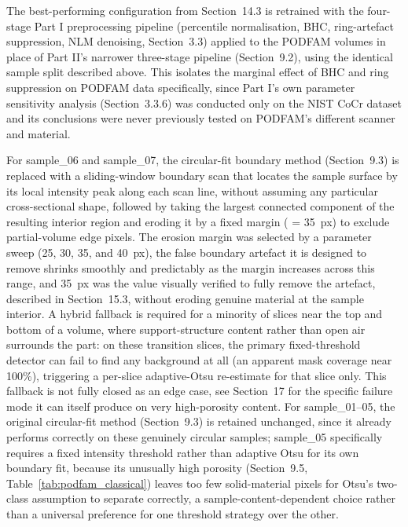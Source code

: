 The best-performing configuration from Section~14.3 is retrained with the four-stage Part I
preprocessing pipeline (percentile normalisation, BHC, ring-artefact suppression, NLM denoising,
Section~3.3) applied to the PODFAM volumes in place of Part II's narrower three-stage pipeline
(Section~9.2), using the identical sample split described above. This isolates the marginal effect of
BHC and ring suppression on PODFAM data specifically, since Part I's own parameter sensitivity
analysis (Section~3.3.6) was conducted only on the NIST CoCr dataset and its conclusions were never
previously tested on PODFAM's different scanner and material.

For sample\_06 and sample\_07, the circular-fit boundary method (Section~9.3) is replaced with a
sliding-window boundary scan that locates the sample surface by its local intensity peak along each
scan line, without assuming any particular cross-sectional shape, followed by taking the largest
connected component of the resulting interior region and eroding it by a fixed margin
( = 35~px) to exclude partial-volume edge pixels. The erosion margin was
selected by a parameter sweep (25, 30, 35, and 40~px), the false boundary artefact it is designed to
remove shrinks smoothly and predictably as the margin increases across this range, and 35~px was the
value visually verified to fully remove the artefact, described in Section~15.3, without eroding
genuine material at the sample interior. A hybrid fallback is required for a minority of slices near
the top and bottom of a volume, where support-structure content rather than open air surrounds the
part: on these transition slices, the primary fixed-threshold detector can fail to find any background
at all (an apparent mask coverage near 100\%), triggering a per-slice adaptive-Otsu re-estimate for
that slice only. This fallback is not fully closed as an edge case, see Section~17 for the specific
failure mode it can itself produce on very high-porosity content. For sample\_01--05, the original
circular-fit method (Section~9.3) is retained unchanged, since it already performs correctly on these
genuinely circular samples; sample\_05 specifically requires a fixed intensity threshold rather than
adaptive Otsu for its own boundary fit, because its unusually high porosity (Section~9.5,
Table~\ref{tab:podfam_classical}) leaves too few solid-material pixels for Otsu's two-class assumption
to separate correctly, a sample-content-dependent choice rather than a universal preference for one
threshold strategy over the other.

